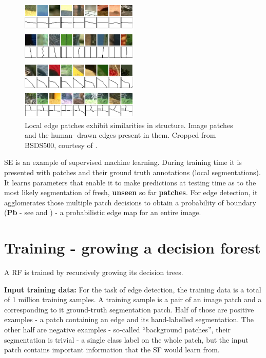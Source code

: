\begin{figure}[ht!]
\centering
 \includegraphics[width=0.5\textwidth]{images/srf/structure-in-edge-patches.png}
\caption[Local patches exhibit similarities in edge structure]{Local edge patches exhibit similarities in structure. Image patches and the human-%
drawn edges present in them. Cropped from BSDS500, courtesy of \cite{DollarICCV13PresentationSlides}.}
\label{fig:srf-structure-in-edge-patches}
\end{figure}

SE is an example of supervised machine learning. During training time it is presented with patches and their ground truth annotations (local segmentations). It learns parameters that enable it to make predictions at testing time as to the most likely segmentation of fresh, {\bf unseen} so far {\bf patches}. For edge detection, it agglomerates those multiple patch decisions to obtain a probability of boundary ({\bf Pb} - see  and ) - a probabilistic edge map for an entire image.

\section{Training - growing a decision forest}
A RF is trained by recursively growing its decision trees. 

\textbf{Input training data:} For the task of edge detection, the training data is a total of 1 million training samples. A training sample is a pair of an image patch and a corresponding to it ground-truth segmentation patch. Half of those are positive examples - a patch containing an edge and its hand-labelled segmentation. The other half are negative examples - so-called ``background patches'', their segmentation is trivial - a single class label on the whole patch, but the input patch contains important information that the SF would learn from. 

